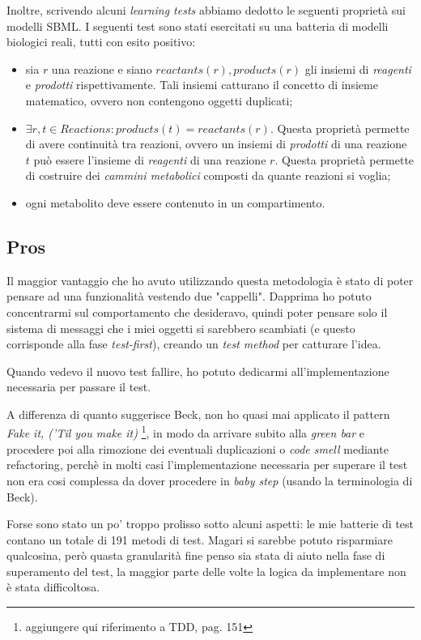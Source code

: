 Inoltre, scrivendo alcuni \emph{learning tests} abbiamo dedotto le
seguenti propriet\`a sui modelli SBML. I seguenti test sono stati
esercitati su una batteria di modelli biologici reali, tutti con esito
positivo:
\begin{itemize}
\item sia $r$ una reazione e siano $reactants(r), products(r)$ gli
  insiemi di \emph{reagenti} e \emph{prodotti} rispettivamente. Tali
  insiemi catturano il concetto di insieme matematico, ovvero non
  contengono oggetti duplicati;
\item $\exists r,t \in Reactions: products(t) = reactants(r)$. Questa
  propriet\`a permette di avere continuit\`a tra reazioni, ovvero un
  insiemi di \emph{prodotti} di una reazione $t$ pu\`o essere
  l'insieme di \emph{reagenti} di una reazione $r$. Questa
  propriet\`a permette di costruire dei \emph{cammini metabolici}
  composti da quante reazioni si voglia;
\item ogni metabolito deve essere contenuto in un compartimento.
\end{itemize}

\subsection{Pros}
Il maggior vantaggio che ho avuto utilizzando questa metodologia \`e
stato di poter pensare ad una funzionalit\`a vestendo due
"cappelli". Dapprima ho potuto concentrarmi sul comportamento che
desideravo, quindi poter pensare solo il sistema di messaggi che i
miei oggetti si sarebbero scambiati (e questo corrisponde alla fase
\emph{test-first}), creando un \emph{test method} per catturare
l'idea.

Quando vedevo il nuovo test fallire, ho potuto dedicarmi
all'implementazione necessaria per passare il test. 

A differenza di quanto suggerisce Beck, non ho quasi mai applicato il
pattern \emph{Fake it, ('Til you make it)} \footnote{aggiungere qui
  riferimento a TDD, pag. 151}, in modo da arrivare subito alla
\emph{green bar} e procedere poi alla rimozione dei eventuali
duplicazioni o \emph{code smell} mediante refactoring, perch\`e in
molti casi l'implementazione necessaria per superare il test non era
cosi complessa da dover procedere in \emph{baby step} (usando la
terminologia di Beck).

Forse sono stato un po' troppo prolisso sotto alcuni aspetti: le mie
batterie di test contano un totale di 191 metodi di test. Magari si
sarebbe potuto risparmiare qualcosina, per\`o quasta granularit\`a
fine penso sia stata di aiuto nella fase di superamento del test, la
maggior parte delle volte la logica da implementare non \`e stata
difficoltosa.

